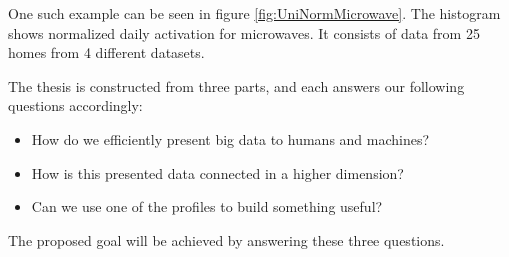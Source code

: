 One such example can be seen in figure \ref{fig:UniNormMicrowave}. The histogram shows normalized daily 
activation for microwaves. It consists of data from 25 homes from 4 different
datasets. 

The thesis is constructed from three parts, and each answers our following questions accordingly:
\begin{itemize}
	\item How do we efficiently present big data to humans and machines?
	\item How is this presented data connected in a higher dimension?
	\item Can we use one of the profiles to build something useful? 
\end{itemize}

The proposed goal will be achieved by answering these three questions. 

